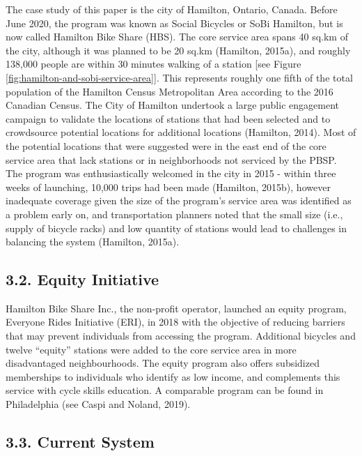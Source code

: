 \documentclass[]{elsarticle} %
\begin{document}
The case study of this paper is the city of Hamilton, Ontario, Canada.
Before June 2020, the program was known as Social Bicycles or SoBi
Hamilton, but is now called Hamilton Bike Share (HBS). The core service
area spans 40 sq.km of the city, although it was planned to be 20 sq.km
(Hamilton, 2015a), and roughly 138,000 people are within 30 minutes
walking of a station {[}see Figure
\ref{fig:hamilton-and-sobi-service-area}{]}. This represents roughly one
fifth of the total population of the Hamilton Census Metropolitan Area
according to the 2016 Canadian Census. The City of Hamilton undertook a
large public engagement campaign to validate the locations of stations
that had been selected and to crowdsource potential locations for
additional locations (Hamilton, 2014). Most of the potential locations
that were suggested were in the east end of the core service area that
lack stations or in neighborhoods not serviced by the PBSP. The program
was enthusiastically welcomed in the city in 2015 - within three weeks
of launching, 10,000 trips had been made (Hamilton, 2015b), however
inadequate coverage given the size of the program's service area was
identified as a problem early on, and transportation planners noted that
the small size (i.e., supply of bicycle racks) and low quantity of
stations would lead to challenges in balancing the system (Hamilton,
2015a).

\hypertarget{equity-initiative}{%
\subsection{3.2. Equity Initiative}\label{equity-initiative}}

Hamilton Bike Share Inc., the non-profit operator, launched an equity
program, Everyone Rides Initiative (ERI), in 2018 with the objective of
reducing barriers that may prevent individuals from accessing the
program. Additional bicycles and twelve ``equity'' stations were added
to the core service area in more disadvantaged neighbourhoods. The
equity program also offers subsidized memberships to individuals who
identify as low income, and complements this service with cycle skills
education. A comparable program can be found in Philadelphia (see Caspi
and Noland, 2019).

\hypertarget{current-system}{%
\subsection{3.3. Current System}\label{current-system}}
\end{document}
